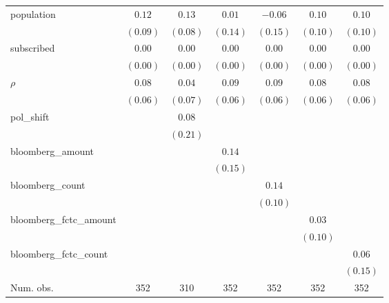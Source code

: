 \begin{table}[!h]
\begin{center}
\begin{tabular}{l c c c c c c }
population              & $0.12$       & $0.13$       & $0.01$       & $-0.06$      & $0.10$       & $0.10$       \\
                        & $(0.09)$     & $(0.08)$     & $(0.14)$     & $(0.15)$     & $(0.10)$     & $(0.10)$     \\
subscribed              & $0.00$       & $0.00$       & $0.00$       & $0.00$       & $0.00$       & $0.00$       \\
                        & $(0.00)$     & $(0.00)$     & $(0.00)$     & $(0.00)$     & $(0.00)$     & $(0.00)$     \\
$\rho$                  & $0.08$       & $0.04$       & $0.09$       & $0.09$       & $0.08$       & $0.08$       \\
                        & $(0.06)$     & $(0.07)$     & $(0.06)$     & $(0.06)$     & $(0.06)$     & $(0.06)$     \\
pol\_shift              &              & $0.08$       &              &              &              &              \\
                        &              & $(0.21)$     &              &              &              &              \\
bloomberg\_amount       &              &              & $0.14$       &              &              &              \\
                        &              &              & $(0.15)$     &              &              &              \\
bloomberg\_count        &              &              &              & $0.14$       &              &              \\
                        &              &              &              & $(0.10)$     &              &              \\
bloomberg\_fctc\_amount &              &              &              &              & $0.03$       &              \\
                        &              &              &              &              & $(0.10)$     &              \\
bloomberg\_fctc\_count  &              &              &              &              &              & $0.06$       \\
                        &              &              &              &              &              & $(0.15)$     \\
\midrule
Num. obs.               & 352          & 310          & 352          & 352          & 352          & 352          \\

\end{tabular}
\end{center}
\end{table}
